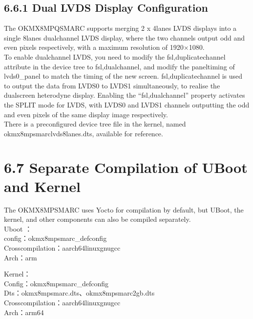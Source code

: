\documentclass[letterpaper,10pt,openany,english]{sphinxmanual}
\begin{document}
\subsection{6.6.1 Dual LVDS Display Configuration}
\label{\detokenize{linux-manual:dual-lvds-display-configuration}}
\sphinxAtStartPar
The OK\sphinxhyphen{}MX8MPQ\sphinxhyphen{}SMARC supports merging 2 x 4lanes LVDS displays into a single 8lanes dual\sphinxhyphen{}channel LVDS display, where the two channels output odd and even pixels respectively, with a maximum resolution of 1920×1080.\\
To enable dual\sphinxhyphen{}channel LVDS, you need to modify the fsl,duplicate\sphinxhyphen{}channel attribute in the device tree to fsl,dual\sphinxhyphen{}channel, and modify the panel\sphinxhyphen{}timing of lvds0\_panel to match the timing of the new screen. fsl,duplicate\sphinxhyphen{}channel is used to output the data from LVDS0 to LVDS1 simultaneously, to realise the dual\sphinxhyphen{}screen heterodyne display. Enabling the “fsl,dual\sphinxhyphen{}channel” property activates the SPLIT mode for LVDS, with LVDS0 and LVDS1 channels outputting the odd and even pixels of the same display image respectively.\\
There is a pre\sphinxhyphen{}configured device tree file in the kernel, named ok\sphinxhyphen{}mx8mp\sphinxhyphen{}smarc\sphinxhyphen{}lvds8lanes.dts, available for reference.


\section{6.7 Separate Compilation of U\sphinxhyphen{}Boot and Kernel}
\label{\detokenize{linux-manual:separate-compilation-of-u-boot-and-kernel}}
\sphinxAtStartPar
The OK\sphinxhyphen{}MX8MP\sphinxhyphen{}SMARC uses Yocto for compilation by default, but U\sphinxhyphen{}Boot, the kernel, and other components can also be compiled separately.\\
Uboot ：\\
config：okmx8mp\sphinxhyphen{}smarc\_defconfig\\
Cross\sphinxhyphen{}compilation：aarch64\sphinxhyphen{}linux\sphinxhyphen{}gnu\sphinxhyphen{}gcc\\
Arch：arm

\sphinxAtStartPar
Kernel：\\
Config：ok\sphinxhyphen{}mx8mp\sphinxhyphen{}smarc\_defconfig\\
Dts：ok\sphinxhyphen{}mx8mp\sphinxhyphen{}smarc.dts、ok\sphinxhyphen{}mx8mp\sphinxhyphen{}smarc\sphinxhyphen{}2gb.dts\\
Cross\sphinxhyphen{}compilation：aarch64\sphinxhyphen{}linux\sphinxhyphen{}gnu\sphinxhyphen{}gcc\\
Arch：arm64
\end{document}

